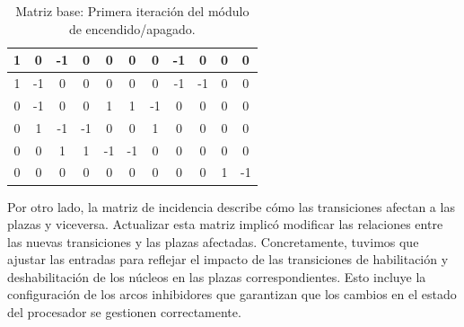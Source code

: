 \begin{table}[H]
    \centering
    \begin{tabular}{|c|c|c|c|c|c|c|c|c|c|c|}
        \hline
        1                      & 0                      & -1                     & 0                      & 0                      & 0                      & 0                      & -1                     & 0                      & \cellcolor{lightgray}0 & \cellcolor{lightgray}0  \\
        \hline
        1                      & -1                     & 0                      & 0                      & 0                      & 0                      & 0                      & -1                     & -1                     & \cellcolor{lightgray}0 & \cellcolor{lightgray}0  \\
        \hline
        0                      & -1                     & 0                      & 0                      & 1                      & 1                      & -1                     & 0                      & 0                      & \cellcolor{lightgray}0 & \cellcolor{lightgray}0  \\
        \hline
        0                      & 1                      & -1                     & -1                     & 0                      & 0                      & 1                      & 0                      & 0                      & \cellcolor{lightgray}0 & \cellcolor{lightgray}0  \\
        \hline
        0                      & 0                      & 1                      & 1                      & -1                     & -1                     & 0                      & 0                      & 0                      & \cellcolor{lightgray}0 & \cellcolor{lightgray}0  \\
        \hline
        \cellcolor{lightgray}0 & \cellcolor{lightgray}0 & \cellcolor{lightgray}0 & \cellcolor{lightgray}0 & \cellcolor{lightgray}0 & \cellcolor{lightgray}0 & \cellcolor{lightgray}0 & \cellcolor{lightgray}0 & \cellcolor{lightgray}0 & \cellcolor{lightgray}1 & \cellcolor{lightgray}-1 \\
        \hline
    \end{tabular}
    \caption{Matriz base: Primera iteración del módulo de encendido/apagado.}
    \label{tabla:matriz_base_post}
\end{table}

Por otro lado, la matriz de incidencia describe cómo las transiciones afectan a las plazas y viceversa. Actualizar esta matriz implicó modificar las relaciones entre las nuevas transiciones y las plazas afectadas. Concretamente, tuvimos que ajustar las entradas para reflejar el impacto de las transiciones de habilitación y deshabilitación de los núcleos en las plazas correspondientes. Esto incluye la configuración de los arcos inhibidores que garantizan que los cambios en el estado del procesador se gestionen correctamente.\par

